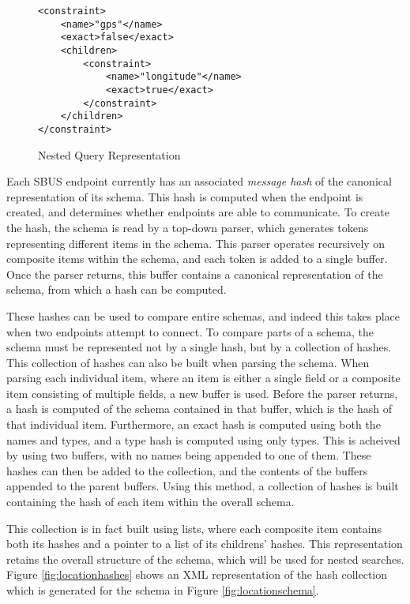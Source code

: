 \documentclass[12pt,twoside,notitlepage]{report}
\begin{document}

\begin{figure}[tbh]
\begin{lstlisting}
<constraint>
	<name>"gps"</name>
	<exact>false</exact>
	<children>
		<constraint>
			<name>"longitude"</name>
			<exact>true</exact>
		</constraint>
	</children>
</constraint>
\end{lstlisting}
\caption{Nested Query Representation}
\label{fig:nested_query}
\end{figure}

Each SBUS endpoint currently has an associated {\sl message hash} of the canonical representation of its schema. 
This hash is computed when the endpoint is created, and determines whether endpoints are able to communicate. 
To create the hash, the schema is read by a top-down parser, which generates tokens representing different items in the schema. 
This parser operates recursively on composite items within the schema, and each token is added to a single buffer. 
Once the parser returns, this buffer contains a canonical representation of the schema, from which a hash can be computed. 

These hashes can be used to compare entire schemas, and indeed this takes place when two endpoints attempt to connect. 
To compare parts of a schema, the schema must be represented not by a single hash, but by a collection of hashes. 
This collection of hashes can also be built when parsing the schema. 
When parsing each individual item, where an item is either a single field or a composite item consisting of multiple fields, a new buffer is used. 
Before the parser returns, a hash is computed of the schema contained in that buffer, which is the hash of that individual item. 
Furthermore, an exact hash is computed using both the names and types, and a type hash is computed using only types. 
This is acheived by using two buffers, with no names being appended to one of them. 
These hashes can then be added to the collection, and the contents of the buffers appended to the parent buffers. 
Using this method, a collection of hashes is built containing the hash of each item within the overall schema. 

This collection is in fact built using lists, where each composite item contains both its hashes and a pointer to a list of its childrens' hashes.
This representation retains the overall structure of the schema, which will be used for nested searches. 
Figure \ref{fig:locationhashes} shows an XML representation of the hash collection which is generated for the schema in Figure \ref{fig:locationschema}.
\end{document}
